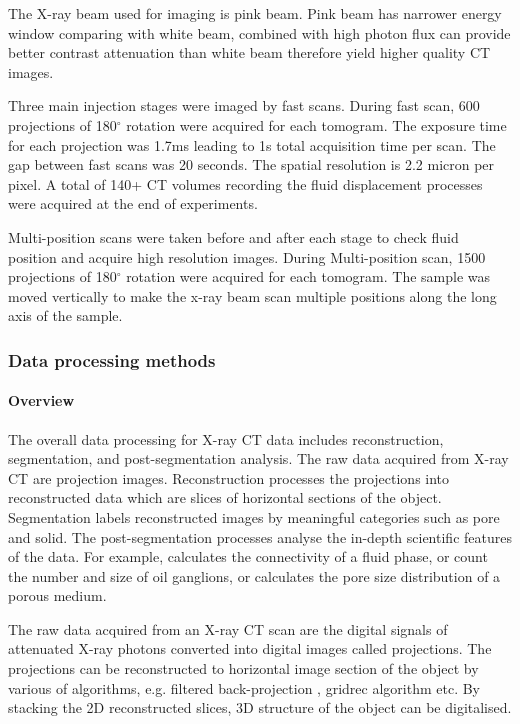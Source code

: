 The X-ray beam used for imaging is pink beam. Pink beam has narrower energy window comparing with white beam, combined with high photon flux can provide better contrast attenuation than white beam therefore yield higher quality CT images.

Three main injection stages were imaged by fast scans. During fast scan, 600 projections of 180$^{\circ}$ rotation were acquired for each tomogram. The exposure time for each projection was 1.7ms leading to 1s total acquisition time per scan. The gap between fast scans was 20 seconds. The spatial resolution is 2.2 micron per pixel. A total of 140+ CT volumes recording the fluid displacement processes were acquired at the end of experiments.

Multi-position scans were taken before and after each stage to check fluid position and acquire high resolution images. During Multi-position scan, 1500 projections of 180$^{\circ}$ rotation were acquired for each tomogram. The sample was moved vertically to make the x-ray beam scan multiple positions along the long axis of the sample.

\subsubsection{Data processing methods}
\paragraph{Overview}
The overall data processing for X-ray CT data includes reconstruction, segmentation, and post-segmentation analysis. The raw data acquired from X-ray CT are projection images. Reconstruction processes the projections into reconstructed data which are slices of horizontal sections of the object. Segmentation labels reconstructed images by meaningful categories such as pore and solid. The post-segmentation processes analyse the in-depth scientific features of the data. For example, calculates the connectivity of a fluid phase, or count the number and size of oil ganglions, or calculates the pore size distribution of a porous medium.

The raw data acquired from an X-ray CT scan are the digital signals of attenuated X-ray photons converted into digital images called projections. The projections can be reconstructed to horizontal image section of the object by various of algorithms, e.g. filtered back-projection\citep{kak2002principles} , gridrec algorithm \citep{marone2012regridding,dowd1999developments} etc. By stacking the 2D reconstructed slices, 3D structure of the object can be digitalised.

